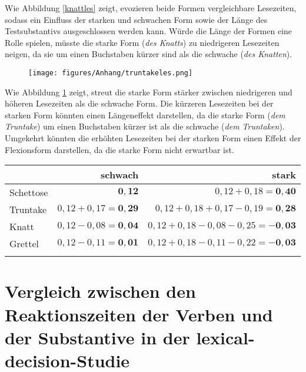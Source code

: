 Wie Abbildung \ref{knattles} zeigt, evozieren beide Formen vergleichbare Lesezeiten, sodass ein Einfluss der starken und schwachen Form sowie der Länge des Testsubstantivs ausgeschlossen werden kann. Würde die Länge der Formen eine Rolle spielen, müsste die starke Form (\textit{des Knatts}) zu niedrigeren Lesezeiten neigen, da sie um einen Buchstaben kürzer sind als die schwache (\textit{des Knatten}).

\begin{figure}[H]
\texttt{[image: figures/Anhang/truntakeles.png]} 
\label{truntakeles}
\end{figure}

Wie Abbildung \ref{truntakeles} zeigt, streut die starke Form stärker zwischen niedrigeren und höheren Lesezeiten als die schwache Form. Die kürzeren Lesezeiten bei der starken Form könnten einen Längeneffekt darstellen, da die starke Form (\textit{dem Truntake}) um einen Buchstaben kürzer ist als die schwache (\textit{dem Truntaken}). Umgekehrt könnten die erhöhten Lesezeiten bei der starken Form einen Effekt der Flexionsform darstellen, da die starke Form nicht erwartbar ist. 

\begin{table}[H]
\begin{tabular}{lrr}
  \lsptoprule
			&		schwach	&	stark \\
			\midrule
Schettose & $ \mathbf{0{,}12} $               & $ 0{,}12 +0{,}18 = \mathbf{0{,}40} $ \\
Truntake  & $ 0{,}12 + 0{,}17 = \mathbf{0{,}29} $ & $ 0{,}12 + 0{,}18 +0{,}17 -0{,}19 = \mathbf{0{,}28} $\\
Knatt     & $ 0{,}12 -0{,}08 = \mathbf{0{,}04}  $ & $ 0{,}12 +0{,}18 -0{,}08  -0{,}25 = \mathbf{-0{,}03}$\\
Grettel   & $ 0{,}12 -0{,}11 = \mathbf{0{,}01}  $ & $ 0{,}12 +0{,}18 -0{,}11  - 0{,}22 = \mathbf{-0{,}03}$ \\
\lspbottomrule
\end{tabular}
\label{ergselfkreuz}
\end{table}

\section[Vergleich zwischen den Reaktionszeiten der Verben und der Substantive]{Vergleich zwischen den Reaktionszeiten der Verben und der Substantive in der lexical-decision-Studie}
\label{vgl}

